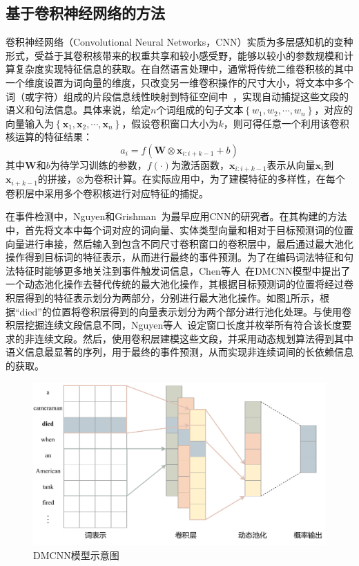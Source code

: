 \subsection{基于卷积神经网络的方法}

卷积神经网络（Convolutional Neural Networks，CNN）实质为多层感知机的变种形式，受益于其卷积核带来的权重共享和较小感受野，能够以较小的参数规模和计算复杂度实现特征信息的获取。在自然语言处理中，通常将传统二维卷积核的其中一个维度设置为词向量的维度，只改变另一维卷积操作的尺寸大小，将文本中多个词（或字符）组成的片段信息线性映射到特征空间中~\cite{zhang2015sensitivity}，实现自动捕捉这些文段的语义和句法信息。具体来说，给定$n$个词组成的句子文本$\left\{w_{1}, w_{2}, \cdots, w_{n}\right\}$，对应的向量输入为$\left\{\boldsymbol{x}_{1}, \boldsymbol{x}_{2}, \cdots, \boldsymbol{x}_{n}\right\}$，假设卷积窗口大小为$k$，则可得任意一个利用该卷积核运算的特征结果：
\begin{equation}
    a_{i}=f\left(\boldsymbol{W} \otimes \boldsymbol{x}_{i: i+k-1}+b\right)
\end{equation}
其中$\boldsymbol{W}$和$b$为待学习训练的参数，$f(\cdot)$为激活函数，$\boldsymbol{x}_{i: i+k-1}$表示从向量$\boldsymbol{x}_{i}$到$\boldsymbol{x}_{i+k-1}$的拼接，$\otimes$为卷积计算。在实际应用中，为了建模特征的多样性，在每个卷积层中采用多个卷积核进行对应特征的捕捉。

在事件检测中，Nguyen和Grishman~\cite{nguyen2015event}为最早应用CNN的研究者。在其构建的方法中，首先将文本中每个词对应的词向量、实体类型向量和相对于目标预测词的位置向量进行串接，然后输入到包含不同尺寸卷积窗口的卷积层中，最后通过最大池化操作得到目标词的特征表示，从而进行最终的事件预测。为了在编码词法特征和句法特征时能够更多地关注到事件触发词信息，Chen等人~\cite{chen2015event}在DMCNN模型中提出了一个动态池化操作去替代传统的最大池化操作，其根据目标预测词的位置将经过卷积层得到的特征表示划分为两部分，分别进行最大池化操作。如图\ref{dmcnn}所示，根据“died”的位置将卷积层得到的向量表示划分为两个部分进行池化处理。与使用卷积层挖掘连续文段信息不同，Nguyen等人~\cite{nguyen2016modeling}设定窗口长度并枚举所有符合该长度要求的非连续文段。然后，使用卷积层建模这些文段，并采用动态规划算法得到其中语义信息最显著的序列，用于最终的事件预测，从而实现非连续词间的长依赖信息的获取。

\begin{figure}[htp]
   \centering
   \includegraphics[width=0.8\linewidth]{figures/chap2/dmcnn.pdf}
   \caption{DMCNN模型示意图}
   \label{dmcnn}
\end{figure}

